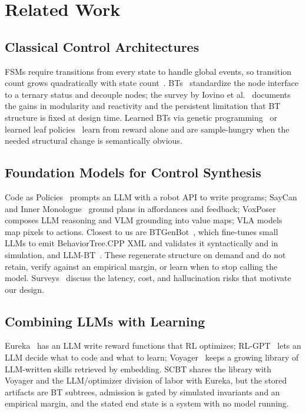 \documentclass[conference]{IEEEtran}
\begin{document}
\section{Related Work}
\label{sec:related}

\subsection{Classical Control Architectures}
FSMs require transitions from every state to handle global events, so transition count grows quadratically with state count~\cite{colledanchise2018bt}. BTs~\cite{ogren2012uav,marzinotto2014unified} standardize the node interface to a ternary status and decouple nodes; the survey by Iovino et al.~\cite{iovino2022survey} documents the gains in modularity and reactivity and the persistent limitation that BT structure is fixed at design time. Learned BTs via genetic programming~\cite{colledanchise2019learning,iovino2021gp} or learned leaf policies~\cite{pereira2015framework} learn from reward alone and are sample-hungry when the needed structural change is semantically obvious.

\subsection{Foundation Models for Control Synthesis}
Code as Policies~\cite{liang2023cap} prompts an LLM with a robot API to write programs; SayCan~\cite{ahn2022saycan} and Inner Monologue~\cite{huang2022inner} ground plans in affordances and feedback; VoxPoser~\cite{huang2023voxposer} composes LLM reasoning and VLM grounding into value maps; VLA models~\cite{brohan2023rt2,kim2024openvla} map pixels to actions. Closest to us are BTGenBot~\cite{izzo2024btgenbot}, which fine-tunes small LLMs to emit BehaviorTree.CPP XML and validates it syntactically and in simulation, and LLM-BT~\cite{zhou2024llmbt}. These regenerate structure on demand and do not retain, verify against an empirical margin, or learn when to stop calling the model. Surveys~\cite{firoozi2024foundation,xu2024foundationmodels} discuss the latency, cost, and hallucination risks that motivate our design.

\subsection{Combining LLMs with Learning}
Eureka~\cite{ma2024eureka} has an LLM write reward functions that RL optimizes; RL-GPT~\cite{liu2024rlgpt} lets an LLM decide what to code and what to learn; Voyager~\cite{wang2023voyager} keeps a growing library of LLM-written skills retrieved by embedding. SCBT shares the library with Voyager and the LLM/optimizer division of labor with Eureka, but the stored artifacts are BT subtrees, admission is gated by simulated invariants and an empirical margin, and the stated end state is a system with no model running.
\end{document}
